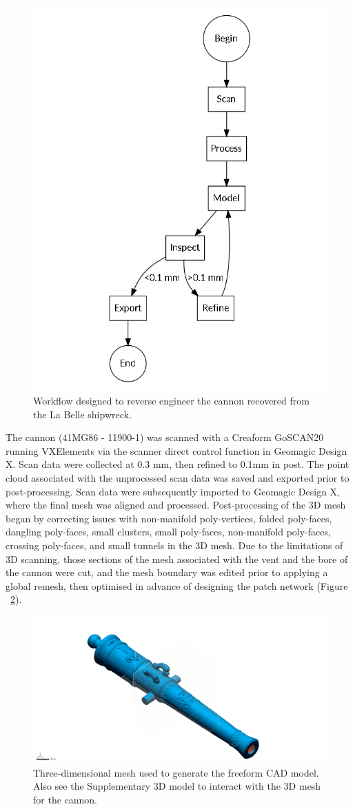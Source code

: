 \documentclass[review]{elsarticle}
\begin{document}
\begin{figure}[ht]\centering
\includegraphics[width=0.6\linewidth]{FigWorkflow}
\caption{Workflow designed to reverse engineer the cannon recovered from the La Belle shipwreck.}
\label{fig:FigWorkflow}
\end{figure}

The cannon (41MG86 - 11900-1) was scanned with a Creaform GoSCAN20 running VXElements via the scanner direct control function in Geomagic Design X. Scan data were collected at 0.3 mm, then refined to 0.1mm in post. The point cloud associated with the unprocessed scan data was saved and exported prior to post-processing. Scan data were subsequently imported to Geomagic Design X, where the final mesh was aligned and processed. Post-processing of the 3D mesh began by correcting issues with non-manifold poly-vertices, folded poly-faces, dangling poly-faces, small clusters, small poly-faces, non-manifold poly-faces, crossing poly-faces, and small tunnels in the 3D mesh. Due to the limitations of 3D scanning, those sections of the mesh associated with the vent and the bore of the cannon were cut, and the mesh boundary was edited prior to applying a global remesh, then optimised in advance of designing the patch network (Figure ~\ref{fig:Fig2}).

\begin{figure}[ht]\centering
\includegraphics[width=\linewidth]{FigLSC2}
\caption{Three-dimensional mesh used to generate the freeform CAD model. Also see the Supplementary 3D model to interact with the 3D mesh for the cannon.}
\label{fig:Fig2}
\end{figure}
\end{document}
